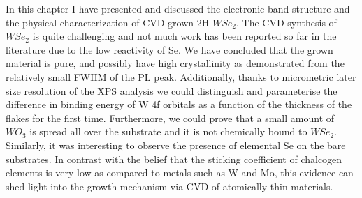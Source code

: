 In this chapter I have presented and discussed the electronic band structure and the physical characterization of CVD grown 2H $WSe_2$.
The CVD synthesis of $WSe_2$ is quite challenging and not much work has been reported so far in the literature due to the low reactivity of Se. We have concluded that the grown material is pure, and possibly have high crystallinity as demonstrated from the relatively small FWHM of the PL peak. Additionally, thanks to micrometric later size resolution of the XPS analysis we could distinguish and parameterise the difference in binding energy of W 4f orbitals as a function of the thickness of the flakes for the first time. Furthermore, we could prove that a small amount of $WO_3$ is spread all over the substrate and it is not chemically bound to $WSe_2$. Similarly, it was interesting to observe the presence of elemental Se on the bare substrates. In contrast with the belief that the sticking coefficient of chalcogen elements is very low as compared to metals such as W and Mo, this evidence can shed light into the growth mechanism via CVD of atomically thin materials.